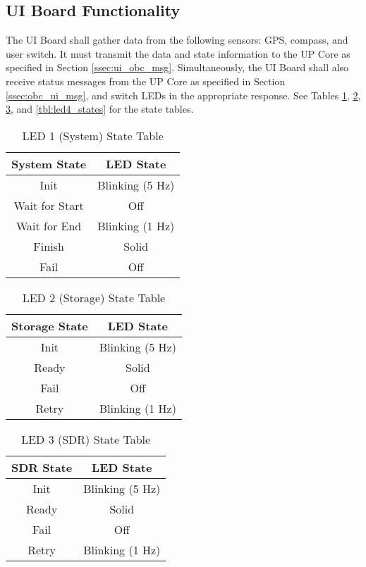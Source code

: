\documentclass{report}
\begin{document}
			\subsection{UI Board Functionality}\label{ssec:ui_functional}
				The UI Board shall gather data from the following sensors: GPS, compass, and user switch.  It must transmit the data and state information to the UP Core as specified in Section \ref{ssec:ui_obc_msg}.  Simultaneously, the UI Board shall also receive status messages from the UP Core as specified in Section \ref{ssec:obc_ui_msg}, and switch LEDs in the appropriate response.  See Tables \ref{tbl:led1_states}, \ref{tbl:led2_states}, \ref{tbl:led3_states}, and \ref{tbl:led4_states} for the state tables.

				\begin{table}[htp]
					\centering
					\caption{LED 1 (System) State Table}
					\label{tbl:led1_states}
					\begin{tabular}{c|c}
						System State & LED State \\ \hline
						Init & Blinking (5 Hz)\\
						Wait for Start & Off\\
						Wait for End & Blinking (1 Hz)\\
						Finish & Solid \\
						Fail & Off
					\end{tabular}
				\end{table}

				\begin{table}[htp]
					\centering
					\caption{LED 2 (Storage) State Table}
					\label{tbl:led2_states}
					\begin{tabular}{c|c}
						Storage State & LED State \\\hline
						Init & Blinking (5 Hz)\\
						Ready & Solid \\
						Fail & Off\\
						Retry & Blinking (1 Hz)
					\end{tabular}
				\end{table}			

				\begin{table}[htp]
					\centering
					\caption{LED 3 (SDR) State Table}
					\label{tbl:led3_states}
					\begin{tabular}{c|c}
						SDR State & LED State \\\hline
						Init & Blinking (5 Hz)\\
						Ready & Solid\\
						Fail & Off\\
						Retry & Blinking (1 Hz)
					\end{tabular}
				\end{table}
\end{document}

